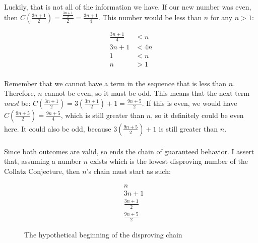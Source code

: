 \documentclass[12pt,letterpaper]{article}
\begin{document}
			\paragraph{} Luckily, that is not all of the information we have. If our new number was even, then $C(\frac{3n+1}{2}) = \frac{\frac{3n+1}{2}}{2} = \frac{3n+1}{4}$. This number would be less than $n$ for any $n > 1$:
			
			\begin{figure}[h]
				\begin{align*}
					\frac{3n+1}{4} &< n\\
					3n+1 &< 4n\\
					1 &< n\\
					n &> 1
				\end{align*}
			\end{figure}
		
			\paragraph{} Remember that we cannot have a term in the sequence that is less than $n$. Therefore, $n$ cannot be even, so it must be odd. This means that the next term \textit{must} be: $C(\frac{3n+1}{2}) = 3\left( \frac{3n + 1}{2} \right) + 1= \frac{9n+5}{2}$. If this is even, we would have $C(\frac{9n+5}{2}) = \frac{9n+5}{4}$, which is still greater than $n$, so it definitely could be even here. It could also be odd, because $3\left(\frac{9n+5}{2}\right) + 1$ is still greater than $n$.
			
			\paragraph{} Since both outcomes are valid, so ends the chain of guaranteed behavior. I assert that, assuming a number $n$ exists which is the lowest disproving number of the Collatz Conjecture, then $n$'s chain must start as such:
			
			\setcounter{equation}{0}
			\begin{figure}[h]
				\begin{align}
					&n\\
					&3n+1\\
					&\frac{3n+1}{2}\\
					&\frac{9n+5}{2}
				\end{align}
				
				\caption{The hypothetical beginning of the disproving chain}
				\label{fig:disproofChainStart}
			\end{figure}
		
\end{document}
